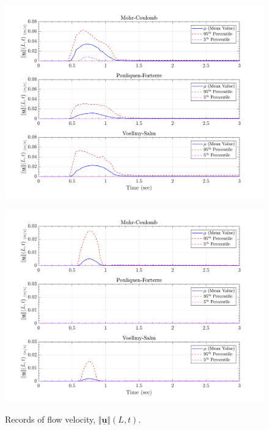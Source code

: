 \documentclass{article}
\begin{document}
\begin{figure}[H]
	\begin{minipage}[b]{0.5\linewidth}
    	\centering
    	\includegraphics[width=1\textwidth]{InclinedPlane/LocalRecords/Records/Vel_L15.png}
    	\label{fig:Ramp-L3-Vel}
	\end{minipage}
	\begin{minipage}[b]{0.5\linewidth}
		\centering
		\includegraphics[width=1\textwidth]{InclinedPlane/LocalRecords/Records/Vel_L17.png}
    	\label{fig:Ramp-L4-Vel}
    \end{minipage}
    \caption{Records of flow velocity, $\Vert \underline{\mathbf{u}} \Vert(L,t)$.}
    \label{fig:Ramp-LM-Vel}    
\end{figure}
\end{document}
